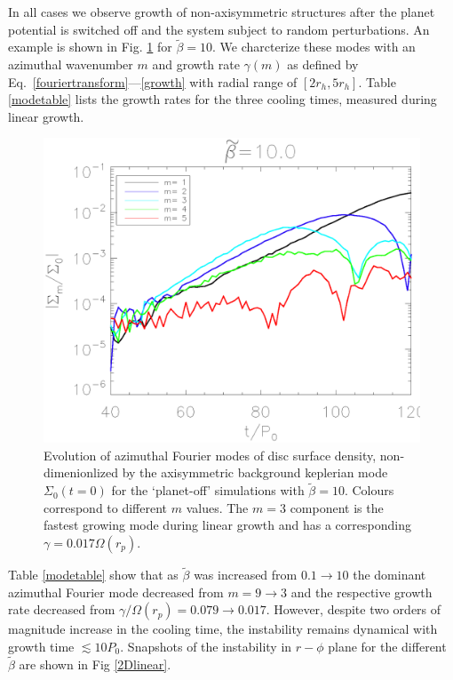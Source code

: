
In all cases we observe growth of non-axisymmetric structures after the
planet potential is switched off and the system subject to random
perturbations. An example is shown in Fig. \ref{linearmodes} for 
$\tilde{\beta}=10$. We charcterize these
modes with an azimuthal wavenumber $m$ and growth rate $\gamma(m)$ as defined by
Eq.~\ref{fouriertransform}---\ref{growth} with radial range of $[2r_h,5r_h]$. Table \ref{modetable}
lists the growth rates for the three cooling
times, measured during linear growth. 


\begin{figure}
  \includegraphics[width=\linewidth,clip=true,trim=1.2cm
    0cm 0cm 0cm]{figures/linear_stability}
  \caption{Evolution of azimuthal Fourier modes of disc surface
    density, non-dimenionlized by the axisymmetric background keplerian mode
 $\Sigma_0(t=0)$ for the
    `planet-off' simulations with $\tilde{\beta}=10$. Colours correspond
    to different $m$ values. The $m=3$ component is the fastest growing
    mode during linear growth and has a corresponding
    $\gamma=0.017\Omega(r_p)$.\label{linearmodes}}
\end{figure}


Table \ref{modetable} show that as
$\tilde{\beta}$ was increased from $ 0.1\rightarrow10$ the dominant
azimuthal Fourier mode decreased from $ m=9\rightarrow3$ and the
respective growth rate decreased from $ \gamma/\Omega(r_p)=0.079
\rightarrow 0.017$. However, despite two orders of magnitude increase in the
cooling time, the instability remains dynamical with growth time
$\lesssim 10P_0$. Snapshots of the instability in $r-\phi$ plane for
the different $\tilde\beta$ are shown in Fig \ref{2Dlinear}. 


